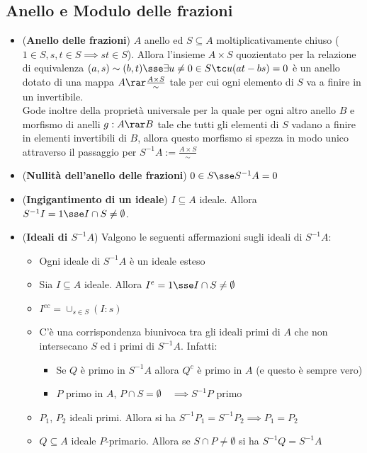 \documentclass[a4paper,NoNotes,GeneralMath]{stdmdoc}
\begin{document}
	\subsection*{Anello e Modulo delle frazioni}
	\begin{itemize}
		\item ({\bf Anello delle frazioni}) $A$ anello ed $S \subseteq A$ moltiplicativamente chiuso ($1 \in S, s,t \in S \implies st \in S$). Allora l'insieme $A \times S$ quozientato per la relazione di equivalenza $(a, s) \sim (b, t) \sse \exists u \neq 0 \in S \tc u (at - bs) = 0$ è un anello dotato di una mappa $A \rar \frac{A \times S}{\sim}$ tale per cui ogni elemento di $S$ va a finire in un invertibile. \\
		Gode inoltre della proprietà universale per la quale per ogni altro anello $B$ e morfismo di anelli $g: A \rar B$ tale che tutti gli elementi di $S$ vadano a finire in elementi invertibili di $B$, allora questo morfismo si spezza in modo unico attraverso il passaggio per $S^{-1}A := \frac{A \times S}{\sim}$
		\item ({\bf Nullità dell'anello delle frazioni}) $0 \in S \sse S^{-1}A = 0$
		\item ({\bf Ingigantimento di un ideale}) $I \subseteq A$ ideale. Allora $S^{-1}I = 1 \sse I \cap S \neq \emptyset$.
		\item ({\bf Ideali di $S^{-1}A$}) Valgono le seguenti affermazioni sugli ideali di $S^{-1}A$:
			\begin{itemize}
				\item Ogni ideale di $S^{-1}A$ è un ideale esteso
				\item Sia $I \subseteq A$ ideale. Allora $I^e = 1 \sse I \cap S \neq \emptyset$
				\item $I^{ec} = \cup_{s \in S} (I : s)$
				\item C'è una corrispondenza biunivoca tra gli ideali primi di $A$ che non intersecano $S$ ed i primi di $S^{-1}A$. Infatti:
					\begin{itemize}
						\item Se $Q$ è primo in $S^{-1}A$ allora $Q^c$ è primo in $A$ (e questo è sempre vero)
						\item $P$ primo in $A$, $P \cap S = \emptyset \quad \implies S^{-1}P$ primo
					\end{itemize}
				\item $P_1$, $P_2$ ideali primi. Allora si ha $S^{-1}P_1 = S^{-1}P_2 \implies P_1 = P_2$
				\item $Q \subseteq A$ ideale $P$-primario. Allora se $S \cap P \neq \emptyset$ si ha $S^{-1}Q = S^{-1}A$ \\

\end{itemize}
\end{itemize}
\end{document}
